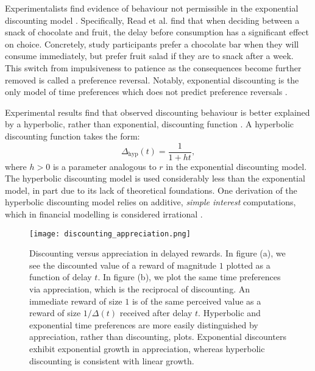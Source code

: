 \documentclass[titlepage, hidelinks, 12pt]{article}
\theoremstyle{plain}
\theoremstyle{remark}
\theoremstyle{definition}
\DeclareMathOperator{\hyp}{hyp}
\begin{document}
Experimentalists find evidence of behaviour not permissible in the exponential discounting model \cite{read98}. 
Specifically, Read et al. find that
when deciding between a snack of chocolate and fruit, the delay before consumption has a significant effect on choice. Concretely, study participants
prefer a chocolate bar
when they will consume immediately, but prefer fruit salad if they are to snack after a week. This switch from impulsiveness to patience as
the consequences become further removed is called a preference reversal. 
Notably, exponential discounting is the only model of time preferences which does not predict preference reversals
\cite{strotz55}. 


Experimental results find that observed discounting behaviour is better explained
by a hyperbolic, rather than exponential, discounting function \cite{maia09, green04, doyle12}. A hyperbolic discounting function takes
the form:
\begin{equation}
    \Delta_{\hyp}(t) = \frac{1}{1+ht},
\end{equation}
where $h>0$ is a parameter analogous to $r$ in the exponential discounting model. The hyperbolic discounting model is used considerably less
than the exponential model, in part due to its lack of theoretical foundations. One derivation of the hyperbolic discounting model relies
on additive, \textit{simple interest} computations, which in financial modelling is considered irrational \cite{rachlin06}. 


\begin{figure}[H]
    \centering
    \texttt{[image: discounting\_appreciation.png]}
    \caption[Example discounting and corresponding appreciation schedules.]{Discounting versus appreciation in delayed rewards. 
        In figure (a), we see the discounted value of a reward of magnitude $1$ plotted as a function of delay $t$. In figure 
        (b), we plot the same time preferences via appreciation, which is the reciprocal of discounting. An immediate reward of size $1$ is
        of the same perceived value as a reward of size $1/\Delta(t)$ received after delay $t$. 
        Hyperbolic and exponential time preferences are more easily distinguished by appreciation, rather than discounting, plots.
Exponential discounters exhibit exponential
        growth in appreciation, whereas hyperbolic discounting is consistent with linear growth.}
\end{figure}
\end{document}
